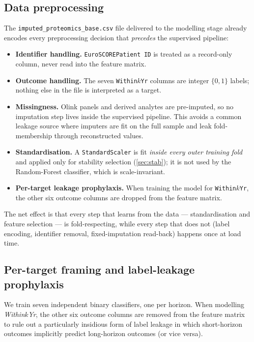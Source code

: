 \documentclass[11pt,a4paper]{article}
\providecommand{\Cref}[1]{\autoref{#1}}
\begin{document}
\subsection{Data preprocessing}
\label{sec:preprocessing}
The \texttt{imputed\_proteomics\_base.csv} file delivered to the
modelling stage already encodes every preprocessing decision that
\emph{precedes} the supervised pipeline:
\begin{itemize}[leftmargin=*]
  \item \textbf{Identifier handling.} \texttt{EuroSCOREPatient ID} is
    treated as a record-only column, never read into the feature matrix.
  \item \textbf{Outcome handling.} The seven \texttt{Within$k$Yr} columns
    are integer $\{0,1\}$ labels; nothing else in the file is interpreted
    as a target.
  \item \textbf{Missingness.} Olink panels and derived analytes are pre-imputed,
    so no imputation step lives inside the supervised pipeline. This avoids
    a common leakage source where imputers are fit on the full sample and
    leak fold-membership through reconstructed values.
  \item \textbf{Standardisation.} A \texttt{StandardScaler} is fit
    \emph{inside every outer training fold} and applied only for
    stability selection (\Cref{sec:stab}); it is not used by the
    Random-Forest classifier, which is scale-invariant.
  \item \textbf{Per-target leakage prophylaxis.} When training the model
    for \texttt{Within$k$Yr}, the other six outcome columns are dropped
    from the feature matrix.
\end{itemize}
The net effect is that every step that learns from the data ---
standardisation and feature selection --- is fold-respecting, while every
step that does not (label encoding, identifier removal, fixed-imputation
read-back) happens once at load time.

\subsection{Per-target framing and label-leakage prophylaxis}
We train seven independent binary classifiers, one per horizon. When
modelling \emph{Within$k$Yr}, the other six outcome columns are removed
from the feature matrix to rule out a particularly insidious form of
label leakage in which short-horizon outcomes implicitly predict
long-horizon outcomes (or vice versa).
\end{document}
